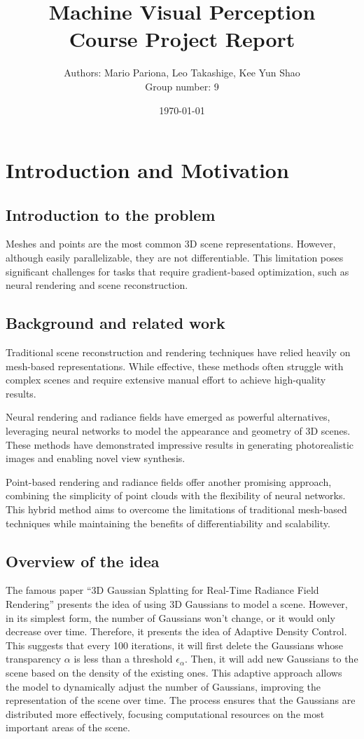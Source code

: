 \documentclass[11pt]{report}
\begin{document}
\title{Machine Visual Perception\\Course Project Report}
\author{Authors: Mario Pariona, Leo Takashige, Kee Yun Shao\\ Group number: 9}
\date{\today}
\maketitle

\chapter{Introduction and Motivation}
\section{Introduction to the problem}
Meshes and points are the most common 3D scene representations. However, although easily parallelizable, they are not differentiable. This limitation poses significant challenges for tasks that require gradient-based optimization, such as neural rendering and scene reconstruction.

\section{Background and related work}
Traditional scene reconstruction and rendering techniques have relied heavily on mesh-based representations. While effective, these methods often struggle with complex scenes and require extensive manual effort to achieve high-quality results.

Neural rendering and radiance fields have emerged as powerful alternatives, leveraging neural networks to model the appearance and geometry of 3D scenes. These methods have demonstrated impressive results in generating photorealistic images and enabling novel view synthesis.

Point-based rendering and radiance fields offer another promising approach, combining the simplicity of point clouds with the flexibility of neural networks. This hybrid method aims to overcome the limitations of traditional mesh-based techniques while maintaining the benefits of differentiability and scalability.

\section{Overview of the idea}
The famous paper “3D Gaussian Splatting for Real-Time Radiance Field Rendering” presents the idea of using 3D Gaussians to model a scene. However, in its simplest form, the number of Gaussians won’t change, or it would only decrease over time. Therefore, it presents the idea of Adaptive Density Control. This suggests that every 100 iterations, it will first delete the Gaussians whose transparency $\alpha$ is less than a threshold $\epsilon_\alpha$.
Then, it will add new Gaussians to the scene based on the density of the existing ones. This adaptive approach allows the model to dynamically adjust the number of Gaussians, improving the representation of the scene over time. The process ensures that the Gaussians are distributed more effectively, focusing computational resources on the most important areas of the scene.
\end{document}
